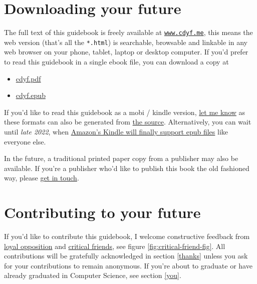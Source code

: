 \documentclass[
]{book}
\providecommand{\tightlist}{%
  \setlength{\itemsep}{0pt}\setlength{\parskip}{0pt}}
\begin{document}
\hypertarget{downloading}{%
\section{Downloading your future}\label{downloading}}

The full text of this guidebook is freely available at \href{https://www.cdyf.me/}{\texttt{www.cdyf.me}}, this means the web version (that's all the \texttt{*.html}) is searchable, browsable and linkable in any web browser on your phone, tablet, laptop or desktop computer. If you'd prefer to read this guidebook in a single ebook file, you can download a copy at

\begin{itemize}
\tightlist
\item
  \href{https://www.cdyf.me/cdyf.pdf}{cdyf.pdf}
\item
  \href{https://www.cdyf.me/cdyf.epub}{cdyf.epub}
\end{itemize}

If you'd like to read this guidebook as a mobi / kindle version, \href{https://personalpages.manchester.ac.uk/staff/duncan.hull/contact}{let me know} as these formats can also be generated from \href{https://github.com/dullhunk/cdyf}{the source}. Alternatively, you can wait until \emph{late 2022}, when \href{https://mashable.com/article/amazon-kindle-epub}{Amazon's Kindle will finally support epub files} like everyone else.

In the future, a traditional printed paper copy from a publisher may also be available. If you're a publisher who'd like to publish this book the old fashioned way, please \href{https://personalpages.manchester.ac.uk/staff/duncan.hull/contact}{get in touch}.

\hypertarget{contributing}{%
\section{Contributing to your future}\label{contributing}}

If you'd like to contribute this guidebook, I welcome constructive feedback from \href{https://en.wikipedia.org/wiki/Loyal_opposition}{loyal opposition} and \href{https://en.wikipedia.org/wiki/Critical_friend}{critical friends}, see figure \ref{fig:critical-friend-fig}. All contributions will be gratefully acknowledged in section \ref{thanks} unless you ask for your contributions to remain anonymous. If you're about to graduate or have already graduated in Computer Science, see section \ref{you}.
\end{document}

